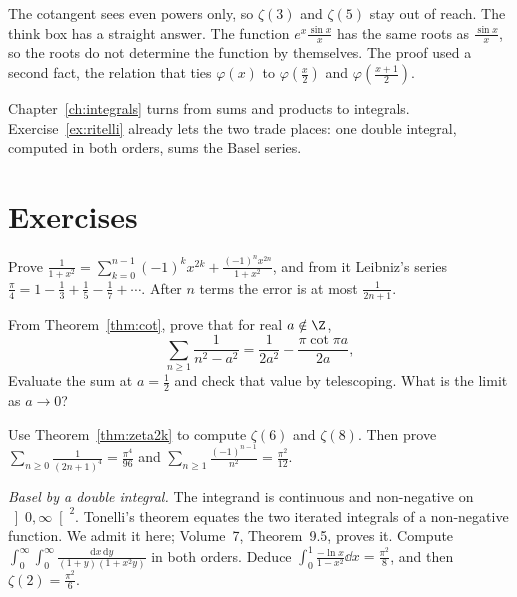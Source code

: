 The cotangent sees even powers only, so $\zeta(3)$ and $\zeta(5)$ stay out of reach. The think box has a straight answer. The function $e^x\frac{\sin x}x$ has the same roots as $\frac{\sin x}x$, so the roots do not determine the function by themselves. The proof used a second fact, the relation that ties $\varphi(x)$ to $\varphi(\frac x2)$ and $\varphi(\frac{x+1}2)$.

Chapter~\ref{ch:integrals} turns from sums and products to integrals. Exercise~\ref{ex:ritelli} already lets the two trade places: one double integral, computed in both orders, sums the Basel series.

\section{Exercises}

\begin{exercise}[$\star$]\label{ex:leibniz}
Prove $\frac1{1+x^2}=\sum_{k=0}^{n-1}(-1)^kx^{2k}+\frac{(-1)^nx^{2n}}{1+x^2}$, and from it Leibniz's series $\frac\pi4=1-\frac13+\frac15-\frac17+\cdots$. After $n$ terms the error is at most $\frac1{2n+1}$.
\end{exercise}

\begin{exercise}[$\star$]\label{ex:cotsums}
From Theorem~\ref{thm:cot}, prove that for real $a\notin\Z$,
\[
\sum_{n\ge1}\frac1{n^2-a^2}=\frac1{2a^2}-\frac{\pi\cot\pi a}{2a},
\]
Evaluate the sum at $a=\frac12$ and check that value by telescoping. What is the limit as $a\to0$?
\end{exercise}

\begin{exercise}[$\star\star$]\label{ex:zetavalues}
Use Theorem~\ref{thm:zeta2k} to compute $\zeta(6)$ and $\zeta(8)$. Then prove $\sum_{n\ge0}\frac1{(2n+1)^4}=\frac{\pi^4}{96}$ and $\sum_{n\ge1}\frac{(-1)^{n-1}}{n^2}=\frac{\pi^2}{12}$.
\end{exercise}

\begin{exercise}[$\star\star$]\label{ex:ritelli}
\emph{Basel by a double integral.} The integrand is continuous and non-negative on $\left]0,\infty\right[^2$. Tonelli's theorem equates the two iterated integrals of a non-negative function. We admit it here; Volume~7, Theorem~9.5, proves it. Compute $\int_0^\infty\!\int_0^\infty\frac{\mathrm dx\,\mathrm dy}{(1+y)(1+x^2y)}$ in both orders. Deduce $\int_0^1\frac{-\ln x}{1-x^2}\dd x=\frac{\pi^2}8$, and then $\zeta(2)=\frac{\pi^2}6$.
\end{exercise}


